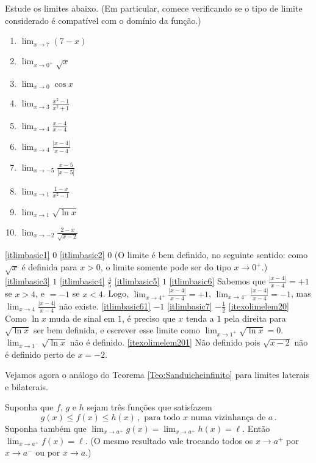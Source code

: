 \begin{exo}\label{Exo:Limiteselementares}
Estude os limites abaixo. (Em particular, comece verificando 
se o tipo de limite considerado é compatível com o domínio da função.)
\begin{multicols}{3}
\begin{enumerate}
\item\label{itlimbasic1} $\lim_{x\to 7}(7-x)$
\item\label{itlimbasic2} $\lim_{x\to 0^+}\sqrt{x}$
\item\label{itlimbasic3} $\lim_{x\to 0}\cos x$
\item\label{itlimbasic4} $\lim_{x\to 3}\frac{x^2-1}{x^2+1}$
\item\label{itlimbasic5} $\lim_{x\to 4}\frac{x-4}{x-4}$
\item\label{itlimbasic6} $\lim_{x\to 4}\frac{|x-4|}{x-4}$
\item\label{itlimbasic61} $\lim_{x\to -5}\frac{x-5}{|x-5|}$
\item\label{itlimbasic7} $\lim_{x\to 1}\frac{1-x}{x^2-1}$
\item\label{itexolimelem20} $\lim_{x\to 1}\sqrt{\ln x}$
\item\label{itexolimelem201} $\lim_{x\to -2}\frac{2-x}{\sqrt{x-2}}$
\end{enumerate}
\end{multicols}
\vspace{0.01cm}
\begin{sol}
\eqref{itlimbasic1} $0$
\eqref{itlimbasic2} $0$ (O limite é bem definido, no seguinte
sentido: como $\sqrt{x}$ é definida para $x>0$, o limite
somente pode ser do tipo $x\to 0^+$.)
\eqref{itlimbasic3} $1$
\eqref{itlimbasic4} $\frac45$
\eqref{itlimbasic5} $1$
\eqref{itlimbasic6} Sabemos que $\frac{|x-4|}{x-4}=+1$ se $x>4$, e
$=-1$ se $x<4$. Logo, $\lim_{x\to 4^+}\frac{|x-4|}{x-4}=+1$,
$\lim_{x\to 4^-}\frac{|x-4|}{x-4}=-1$, mas $\lim_{x\to
4}\frac{|x-4|}{x-4}$ não existe.
\eqref{itlimbasic61} $-1$
\eqref{itlimbasic7} $-\frac12$
\eqref{itexolimelem20} Como $\ln x$ muda de sinal em $1$, é preciso
que $x$ tenda a $1$ pela direita para $\sqrt{\ln x}$ ser bem definida,
e escrever esse limite como $\lim_{x\to 1^+}\sqrt{\ln x}=0$.
$\lim_{x\to 1^-}\sqrt{\ln x}$ não é definido.
\eqref{itexolimelem201} Não definido pois $\sqrt{x-2}$ não é definido perto de $x=-2$.
\end{sol}
\end{exo}

 Vejamos agora o análogo do Teorema \ref{Teo:Sanduicheinfinito} para limites laterais e
bilaterais.
\begin{teo}\label{Teo:Sanduichefinito}
 Suponha que $f$, $g$ e $h$ sejam três funções que satisfazem
$$g(x)\leq f(x)\leq h(x)\,,\text{ para todo $x$ numa vizinhança de $a$}\,.
$$
Suponha também que
$\lim_{x\to a^+}g(x)=\lim_{x\to a^+}h(x)=\ell$. Então 
$\lim_{x\to a^+}f(x)=\ell$.
(O mesmo resultado vale trocando todos os $x\to a^+$ por $x\to a^-$ ou por $x\to a$.)
\end{teo}


